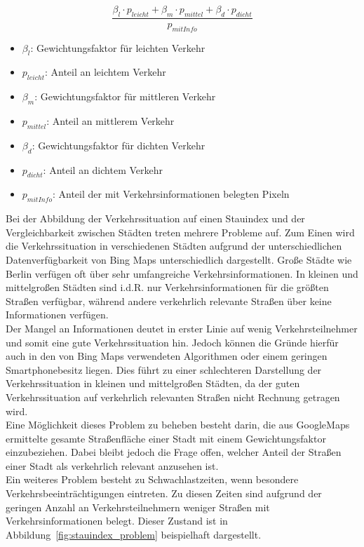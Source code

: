 \begin{equation}\label{eq:1}
\frac{\beta_l\cdot p_{leicht}+\beta_m\cdot p_{mittel}+\beta_d\cdot p_{dicht}}{p_{mit Info}}
\end{equation}
\begin{itemize}
\item $\beta_l$: Gewichtungsfaktor für leichten Verkehr
\item $p_{leicht}$: Anteil an leichtem Verkehr
\item $\beta_m$: Gewichtungsfaktor für mittleren Verkehr
\item $p_{mittel}$: Anteil an mittlerem Verkehr
\item $\beta_d$: Gewichtungsfaktor für dichten Verkehr
\item $p_{dicht}$: Anteil an dichtem Verkehr
\item $p_{mit Info}$: Anteil der mit Verkehrsinformationen belegten Pixeln
\end{itemize}

Bei der Abbildung der Verkehrssituation auf einen Stauindex und der Vergleichbarkeit zwischen Städten treten mehrere Probleme auf. Zum Einen wird die Verkehrssituation in verschiedenen Städten aufgrund der unterschiedlichen Datenverfügbarkeit von Bing Maps unterschiedlich dargestellt. Große Städte wie Berlin verfügen oft über sehr umfangreiche Verkehrsinformationen. In kleinen und mittelgroßen Städten sind i.d.R. nur Verkehrsinformationen für die größten Straßen verfügbar, während andere verkehrlich relevante Straßen über keine Informationen verfügen.\\ Der Mangel an Informationen deutet in erster Linie auf wenig Verkehrsteilnehmer und somit eine gute Verkehrssituation hin. Jedoch können die Gründe hierfür auch in den von Bing Maps verwendeten Algorithmen oder einem geringen Smartphonebesitz liegen. Dies führt zu einer schlechteren Darstellung der Verkehrssituation in kleinen und mittelgroßen Städten, da der guten Verkehrssituation auf verkehrlich relevanten Straßen nicht Rechnung getragen wird.\\  
Eine Möglichkeit dieses Problem zu beheben besteht darin, die aus GoogleMaps ermittelte gesamte Straßenfläche einer Stadt mit einem Gewichtungsfaktor einzubeziehen. Dabei bleibt jedoch die Frage offen, welcher Anteil der Straßen einer Stadt als verkehrlich relevant anzusehen ist.\\
Ein weiteres Problem besteht zu Schwachlastzeiten, wenn besondere Verkehrsbeeinträchtigungen eintreten. Zu diesen Zeiten sind aufgrund der geringen Anzahl an Verkehrsteilnehmern weniger Straßen mit Verkehrsinformationen belegt. Dieser Zustand ist in Abbildung~\ref{fig:stauindex_problem} beispielhaft dargestellt. 

